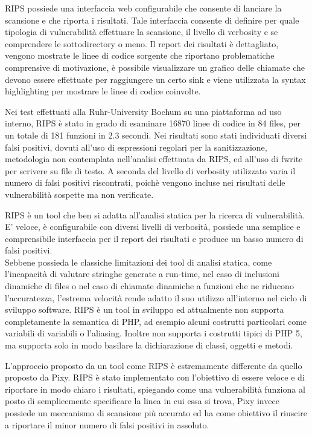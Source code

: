 RIPS possiede una interfaccia web configurabile che consente di lanciare la scansione e che riporta i risultati. Tale interfaccia consente di definire per quale tipologia di vulnerabilità effettuare la scansione, il livello di verbosity e se comprendere le sottodirectory o meno. Il report dei risultati è dettagliato, vengono mostrate le linee di codice sorgente che riportano problematiche comprensive di motivazione, è possibile visualizzare un grafico delle chiamate che devono essere effettuate per raggiungere un certo sink e viene utilizzata la syntax highlighting per mostrare le linee di codice coinvolte.

Nei test effettuati alla Ruhr-University Bochum su una piattaforma ad uso interno, RIPS è stato in grado di esaminare 16870 linee di codice in 84 files, per un totale di 181 funzioni in 2.3 secondi. Nei risultati sono stati individuati diversi falsi positivi, dovuti all'uso di espressioni regolari per la sanitizzazione, metodologia non contemplata nell'analisi effettuata da RIPS, ed all'uso di fwrite per scrivere su file di testo. A seconda del livello di verbosity utilizzato varia il numero di falsi positivi riscontrati, poichè vengono incluse nei risultati delle vulnerabilità sospette ma non verificate.

RIPS è un tool che ben si adatta all'analisi statica per la ricerca di vulnerabilità. E' veloce, è configurabile con diversi livelli di verbosità, possiede una semplice e comprensibile interfaccia per il report dei risultati e produce un basso numero di falsi positivi.\\
Sebbene possieda le classiche limitazioni dei tool di analisi statica, come l'incapacità di valutare stringhe generate a run-time, nel caso di inclusioni dinamiche di files o nel caso di chiamate dinamiche a funzioni che ne riducono l'accuratezza, l'estrema velocità rende adatto il suo utilizzo all'interno nel ciclo di sviluppo software.
RIPS è un tool in sviluppo ed attualmente non supporta completamente la semantica di PHP, ad esempio alcuni costrutti particolari come variabili di variabili o l'aliasing. Inoltre non supporta i costrutti tipici di PHP 5, ma supporta solo in modo basilare la dichiarazione di classi, oggetti e metodi.

L'approccio proposto da un tool come RIPS è estremamente differente da quello proposto da Pixy. RIPS è stato implementato con l'obiettivo di essere veloce e di riportare in modo chiaro i risultati, spiegando come una vulnerabilità funziona al posto di semplicemente specificare la linea in cui essa si trova, Pixy invece possiede un meccanismo di scansione più accurato ed ha come obiettivo il riuscire a riportare il minor numero di falsi positivi in assoluto.

